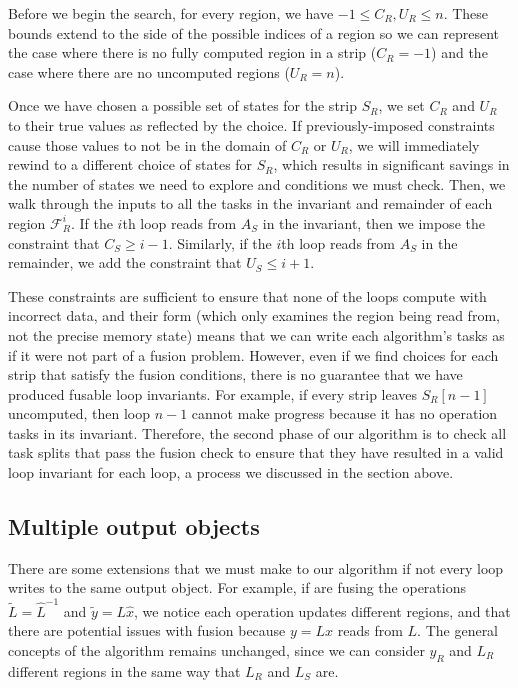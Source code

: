 \documentclass[12pt,letterpaper]{article}
\newcommand*{\opF}{\mathcal{F}}
\begin{document}
Before we begin the search, for every region, we have $-1 \leq C_R, U_R \leq n$.
These bounds extend to the side of the possible indices of a region so we can represent the case where there is no fully computed region in a strip ($C_R = -1$) and the case where there are no uncomputed regions ($U_R = n$).

Once we have chosen a possible set of states for the strip $S_R$, we set $C_R$ and $U_R$ to their true values as reflected by the choice.
If previously-imposed constraints cause those values to not be in the domain of $C_R$ or $U_R$, we will immediately rewind to a different choice of states for $S_R$, which results in significant savings in the number of states we need to explore and conditions we must check.
Then, we walk through the inputs to all the tasks in the invariant and remainder of each region $\opF_R^i$.
If the $i$th loop reads from $A_S$ in the invariant, then we impose the constraint that $C_S \geq i - 1$.
Similarly, if the $i$th loop reads from $A_S$ in the remainder, we add the constraint that $U_S \leq i + 1$.

These constraints are sufficient to ensure that none of the loops compute with incorrect data, and their form (which only examines the region being read from, not the precise memory state) means that we can write each algorithm's tasks as if it were not part of a fusion problem.
However, even if we find choices for each strip that satisfy the fusion conditions, there is no guarantee that we have produced fusable loop invariants.
For example, if every strip leaves $S_R[n - 1]$ uncomputed, then loop $n - 1$ cannot make progress because it has no operation tasks in its invariant.
Therefore, the second phase of our algorithm is to check all task splits that pass the fusion check to ensure that they have resulted in a valid loop invariant for each loop, a process we discussed in the section above.
\subsection{Multiple output objects}
There are some extensions that we must make to our algorithm if not every loop writes to the same output object.
For example, if are fusing the operations $\widetilde{L} = \hat{L}^{-1}$ and $\widetilde{y} = L\hat{x}$, we notice each operation updates different regions, and that there are potential issues with fusion because $y = Lx$ reads from $L$.
The general concepts of the algorithm remains unchanged, since we can consider $y_R$ and $L_R$ different regions in the same way that $L_R$ and $L_S$ are.
\end{document}
